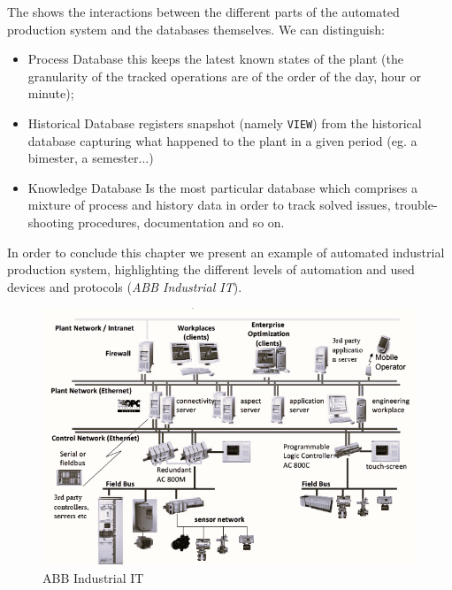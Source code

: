 The  shows the interactions between the different parts of the automated production system and the databases themselves. We can distinguish:
\begin{itemize}
    \itemsep-0.3em
    \item \textsf{Process Database} this keeps the latest known states of the plant (the granularity of the tracked operations are of the order of the day, hour or minute);
    \item \textsf{Historical Database} registers snapshot (namely \texttt{VIEW}) from the historical database capturing what happened to the plant in a given period (eg. a bimester, a semester...)
    \item \textsf{Knowledge Database} Is the most particular database which comprises a mixture of process and history data in order to track solved issues, trouble-shooting procedures, documentation and so on.
\end{itemize}

In order to conclude this chapter we present an example of automated industrial production system, highlighting the different levels of automation and used devices and protocols (\textit{ABB Industrial IT}).

\begin{figure}[h]
    \centering
    \includegraphics[scale=0.9]{img/ABB.png}
    \caption{ABB Industrial IT}
\end{figure}